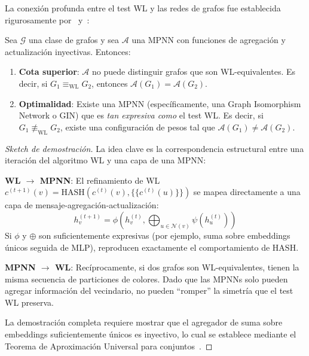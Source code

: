 La conexión profunda entre el test WL y las redes de grafos fue establecida rigurosamente por~\citet{xu2019how} y~\citet{morris2019weisfeiler}:

\begin{theorem}\label{thm:wl_mpnn_equivalencia}
Sea $\mathcal{G}$ una clase de grafos y sea $\mathcal{A}$ una \gls{MPNN} con funciones de agregación y actualización inyectivas. Entonces:
\begin{enumerate}
    \item \textbf{Cota superior}: $\mathcal{A}$ no puede distinguir grafos que son WL-equivalentes. Es decir, si $G_1 \equiv_{\mathrm{WL}} G_2$, entonces $\mathcal{A}(G_1) = \mathcal{A}(G_2)$.

    \item \textbf{Optimalidad}: Existe una \gls{MPNN} (específicamente, una Graph Isomorphism Network o GIN) que es \textit{tan expresiva como} el test WL. Es decir, si $G_1 \not\equiv_{\mathrm{WL}} G_2$, existe una configuración de pesos tal que $\mathcal{A}(G_1) \neq \mathcal{A}(G_2)$.
\end{enumerate}
\end{theorem}

\begin{proof}[Sketch de demostración]
La idea clave es la correspondencia estructural entre una iteración del algoritmo WL y una capa de una \gls{MPNN}:

\textbf{WL $\rightarrow$ MPNN}: El refinamiento de WL $c^{(t+1)}(v) = \mathrm{HASH}(c^{(t)}(v), \{\{c^{(t)}(u)\}\})$ se mapea directamente a una capa de mensaje-agregación-actualización:
\[
h_v^{(t+1)} = \phi\left(h_v^{(t)}, \bigoplus_{u \in \mathcal{N}(v)} \psi(h_u^{(t)})\right)
\]
Si $\phi$ y $\oplus$ son suficientemente expresivas (por ejemplo, suma sobre embeddings únicos seguida de MLP), reproducen exactamente el comportamiento de $\mathrm{HASH}$.

\textbf{MPNN $\rightarrow$ WL}: Recíprocamente, si dos grafos son WL-equivalentes, tienen la misma secuencia de particiones de colores. Dado que las \glspl{MPNN} solo pueden agregar información del vecindario, no pueden ``romper'' la simetría que el test WL preserva.

La demostración completa requiere mostrar que el agregador de suma sobre embeddings suficientemente únicos es inyectivo, lo cual se establece mediante el Teorema de Aproximación Universal para conjuntos~\citep{zaheer2017deepsets}.
\end{proof}

